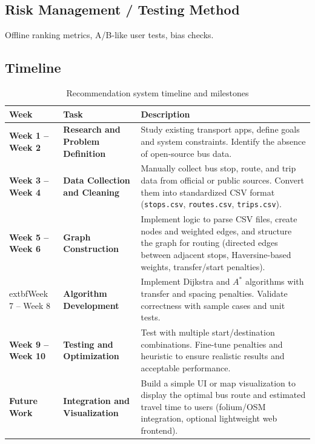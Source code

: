\subsection{Risk Management / Testing Method}
Offline ranking metrics, A/B-like user tests, bias checks.

\subsection{Timeline}
\begin{table}[H]
  \centering
  \renewcommand{\arraystretch}{1.15}
  \begin{tabularx}{\textwidth}{|>{\raggedright\arraybackslash}p{3.2cm}|>{\raggedright\arraybackslash}p{3.2cm}|>{\raggedright\arraybackslash}X|}
    \hline
    	\textbf{Week} & \textbf{Task} & \textbf{Description} \\
    \hline
    	\textbf{Week 1 -- Week 2} & \textbf{Research and Problem Definition} & Study existing transport apps, define goals and system constraints. Identify the absence of open-source bus data. \\
    \hline
    	\textbf{Week 3 -- Week 4} & \textbf{Data Collection and Cleaning} & Manually collect bus stop, route, and trip data from official or public sources. Convert them into standardized CSV format (\texttt{stops.csv}, \texttt{routes.csv}, \texttt{trips.csv}). \\
    \hline
    	\textbf{Week 5 -- Week 6} & \textbf{Graph Construction} & Implement logic to parse CSV files, create nodes and weighted edges, and structure the graph for routing (directed edges between adjacent stops, Haversine-based weights, transfer/start penalties). \\
    \hline
      								extbf{Week 7 -- Week 8} & \textbf{Algorithm Development} & Implement Dijkstra and $A^*$ algorithms with transfer and spacing penalties. Validate correctness with sample cases and unit tests. \\
    \hline
    	\textbf{Week 9 -- Week 10} & \textbf{Testing and Optimization} & Test with multiple start/destination combinations. Fine-tune penalties and heuristic to ensure realistic results and acceptable performance. \\
    \hline
    	\textbf{Future Work} & \textbf{Integration and Visualization} & Build a simple UI or map visualization to display the optimal bus route and estimated travel time to users (folium/OSM integration, optional lightweight web frontend). \\
    \hline
  \end{tabularx}
  \caption{Recommendation system timeline and milestones}\label{tab:reco-timeline}
\end{table}

